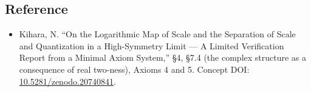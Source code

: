 \documentclass[11pt]{ltjsarticle}
\providecommand{\tightlist}{\setlength{\itemsep}{0pt}\setlength{\parskip}{0pt}}
\begin{document}
\subsection{Reference}\label{reference}

\begin{itemize}
\tightlist
\item
  Kihara, N. ``On the Logarithmic Map of Scale and the Separation of
  Scale and Quantization in a High-Symmetry Limit --- A Limited
  Verification Report from a Minimal Axiom System,'' §4, §7.4 (the
  complex structure as a consequence of real two-ness), Axioms 4 and 5.
  Concept DOI:
  \href{https://doi.org/10.5281/zenodo.20740841}{10.5281/zenodo.20740841}.
\end{itemize}
\end{document}
